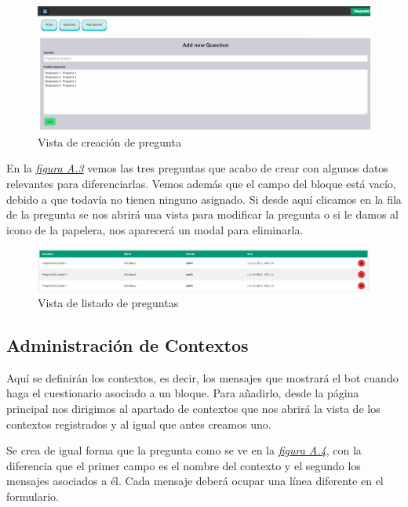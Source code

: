 \begin{figure}[!ht]
    \centering
    \includegraphics[width=1\textwidth]{imagenes/aniadir_pregunta_a.png}
    \caption{ Vista de creación de pregunta }
    \label{fig:creacion_pregunta}
\end{figure}
 

En la \textit{\hyperref[fig:listado-preg]{figura A.3}} vemos las tres preguntas que acabo de crear con algunos datos relevantes para diferenciarlas. Vemos además que el campo del bloque está vacío, debido a que todavía no tienen ninguno asignado. Si desde aquí clicamos en la fila de la pregunta se nos abrirá una vista para modificar la pregunta o si le damos al icono de la papelera, nos aparecerá un modal para eliminarla.\vspace{0.5cm}

\begin{figure}[!ht]
    \centering
    \includegraphics[width=1\textwidth]{imagenes/list_pregunta_a.png}
    \caption{ Vista de listado de preguntas }
    \label{fig:listado-preg}
\end{figure}\vspace{1cm}

\subsection{Administración de Contextos}

Aquí se definirán los contextos, es decir, los mensajes que mostrará el bot cuando haga el cuestionario asociado a un bloque. Para añadirlo, desde la página principal nos dirigimos al apartado de contextos que nos abrirá la vista de los contextos registrados y al igual que antes creamos uno. 

Se crea de igual forma que la pregunta como se ve en la \textit{\hyperref[fig:creacion-contexto]{figura A.4}}, con la diferencia que el primer campo es el nombre del contexto y el segundo los mensajes asociados a él. Cada mensaje deberá ocupar una línea diferente en el formulario. \vspace{2cm}

